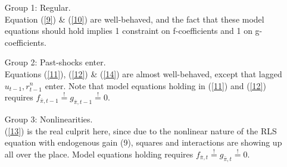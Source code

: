 \documentclass[11pt]{article}
\renewcommand{\[}{\begin{equation}}
\renewcommand{\]}{\end{equation}}
\begin{document}
\begin{enumerate}
\item[Group 1:] Regular.\\
Equation (\ref{9}) \& (\ref{10}) are well-behaved, and the fact that these model equations should hold implies 1 constraint on f-coefficients and 1 on g-coefficients.
\item[Group 2:] Past-shocks enter.\\
Equations (\ref{11}), (\ref{12}) \& (\ref{14}) are almost well-behaved, except that lagged $u_{t-1}, r_{t-1}^n$ enter. Note that model equations holding in (\ref{11}) and (\ref{12}) requires $f_{\bar{\pi},t-1}\stackrel{!}{=}g_{\bar{\pi},t-1} \overset{!}{=} 0$.
\item[Group 3:] Nonlinearities.\\
(\ref{13}) is the real culprit here, since due to the nonlinear nature of the RLS equation with endogenous gain (9), squares and interactions are showing up all over the place. Model equations holding requires $f_{\bar{\pi},t}\stackrel{!}{=}g_{\bar{\pi},t} \overset{!}{=} 0$.
\end{enumerate}
\end{document}
